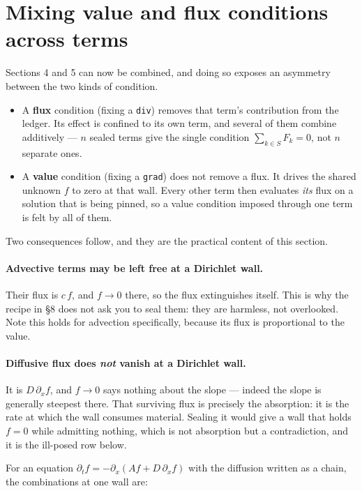 \documentclass[11pt]{article}
\newcommand{\code}[1]{\texttt{#1}}
\begin{document}
\section{Mixing value and flux conditions across terms}

Sections 4 and 5 can now be combined, and doing so exposes an asymmetry between
the two kinds of condition.

\begin{itemize}\itemsep2pt
\item A \textbf{flux} condition (fixing a \code{div}) removes that term's
      contribution from the ledger. Its effect is confined to its own term, and
      several of them combine additively --- $n$ sealed terms give the single
      condition $\sum_{k\in S}F_k=0$, not $n$ separate ones.
\item A \textbf{value} condition (fixing a \code{grad}) does not remove a flux.
      It drives the shared unknown $f$ to zero at that wall. Every other term
      then evaluates \emph{its} flux on a solution that is being pinned, so a
      value condition imposed through one term is felt by all of them.
\end{itemize}

Two consequences follow, and they are the practical content of this section.

\paragraph{Advective terms may be left free at a Dirichlet wall.} Their flux is
$c\,f$, and $f\to0$ there, so the flux extinguishes itself. This is why the
recipe in \S8 does not ask you to seal them: they are harmless, not overlooked.
Note this holds for advection specifically, because its flux is proportional to
the value.

\paragraph{Diffusive flux does \emph{not} vanish at a Dirichlet wall.} It is
$D\,\partial_x f$, and $f\to0$ says nothing about the slope --- indeed the slope
is generally steepest there. That surviving flux is precisely the absorption:
it is the rate at which the wall consumes material. Sealing it would give a wall
that holds $f=0$ while admitting nothing, which is not absorption but a
contradiction, and it is the ill-posed row below.

For an equation $\partial_t f = -\partial_x(A f + D\,\partial_x f)$ with the
diffusion written as a chain, the combinations at one wall are:
\end{document}
